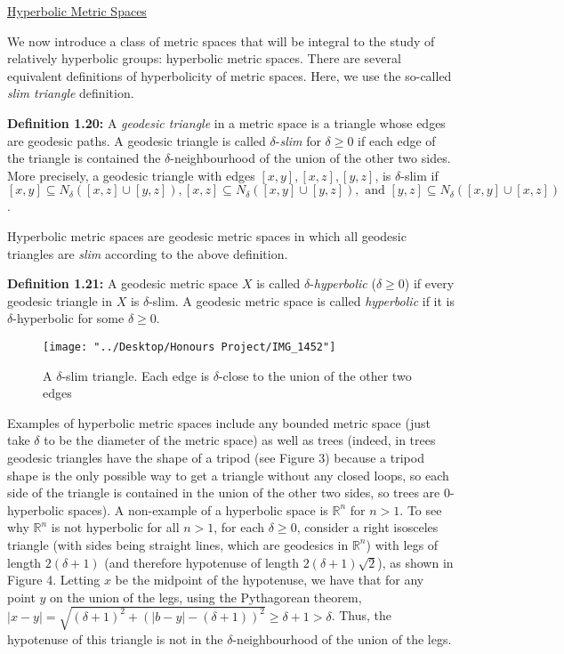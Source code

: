 \documentclass[12pt]{article}
\newcommand{\vs}{\vskip10pt}
\begin{document}
 	\vs
 	
	\underline{Hyperbolic Metric Spaces}
	
	\vs 
	
	We now introduce a class of metric spaces that will be integral to the study of relatively hyperbolic groups: hyperbolic metric spaces. There are several equivalent definitions of hyperbolicity of metric spaces. Here, we use the so-called \textit{slim triangle} definition. 
	
	\vs 
	
	\textbf{Definition 1.20: } A \textit{geodesic triangle} in a metric space is a triangle whose edges are geodesic paths. A geodesic triangle is called $\delta$-\textit{slim} for $\delta \geq 0$ if each edge of the triangle is contained the $\delta$-neighbourhood of the union of the other two sides. More precisely, a geodesic triangle with edges $[x,y], [x,z], [y,z]$, is $\delta$-slim if $[x,y] \subseteq N_{\delta} ([x,z] \cup [y,z]), [x,z] \subseteq N_{\delta} ([x,y] \cup [y,z]), \text{ and } [y,z] \subseteq N_{\delta} ([x,y] \cup [x,z])$.
	
	\vs 
	
	Hyperbolic metric spaces are geodesic metric spaces in which all geodesic triangles are \textit{slim} according to the above definition.
	
	\vs 
	
	
	\textbf{Definition 1.21: } A geodesic metric space $X$ is called $\delta$-\textit{hyperbolic} ($\delta \geq 0$) if every geodesic triangle in $X$ is $\delta$-slim. A geodesic metric space is called \textit{hyperbolic} if it is $\delta$-hyperbolic for some $\delta \geq 0$.
	
	\begin{figure} [H]
		\centering
		\texttt{[image: "../Desktop/Honours Project/IMG\_1452"]}
		\caption{A $\delta$-slim triangle. Each edge is $\delta$-close to the union of the other two edges}
		\label{fig:img1452}
	\end{figure}
	
	Examples of hyperbolic metric spaces include any bounded metric space (just take $\delta$ to be the diameter of the metric space) as well as trees (indeed, in trees geodesic triangles have the shape of a tripod (see Figure 3) because a tripod shape is the only possible way to get a triangle without any closed loops, so each side of the triangle is contained in the union of the other two sides, so trees are 0-hyperbolic spaces). A non-example of a hyperbolic space is $\mathbb{R}^n$ for $n > 1$. To see why $\mathbb{R}^n$ is not hyperbolic for all $n > 1$, for each $\delta \geq 0$, consider a right isosceles triangle (with sides being straight lines, which are geodesics in $\mathbb{R}^n$) with legs of length $2(\delta + 1)$ (and therefore hypotenuse of length $2(\delta + 1)\sqrt2$), as shown in Figure 4. Letting $x$ be the midpoint of the hypotenuse, we have that for any point $y$ on the union of the legs, using the Pythagorean theorem, $\vert x - y \vert = \sqrt{(\delta + 1)^2 + (\vert b - y \vert - (\delta + 1))^2} \geq \delta + 1 > \delta$. Thus, the hypotenuse of this triangle is not in the $\delta$-neighbourhood of the union of the legs. 
	
\end{document}
